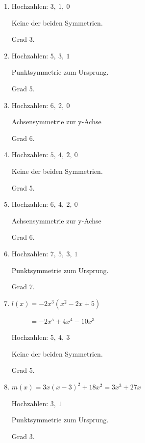 \begin{Answer}[ref=ganzSymA1]

	\begin{minipage}{\textwidth}
		\begin{minipage}[t]{0.5\textwidth}
			\begin{enumerate}[label=\alph*)]
				\item Hochzahlen: \(3,\ 1,\ 0\)

				Keine der beiden Symmetrien.
				
				Grad 3.
				\item Hochzahlen: \(5,\ 3,\ 1\)

				Punktsymmetrie zum Ursprung.
				
				Grad 5.
				\item Hochzahlen: \(6,\ 2,\ 0\)

				Achsensymmetrie zur y-Achse
				
				Grad 6.
				\item Hochzahlen: \(5,\ 4,\ 2,\ 0\)

				Keine der beiden Symmetrien.
				
				Grad 5.
			\end{enumerate}
		\end{minipage}%
		\begin{minipage}[t]{0.5\textwidth}
			\begin{enumerate}[label=\alph*)]
				\setcounter{enumi}{4}
				\item Hochzahlen: \(6,\ 4,\ 2,\ 0\)

				Achsensymmetrie zur y-Achse
				
				Grad 6.
				\item Hochzahlen: \(7,\ 5,\ 3,\ 1\)

				Punktsymmetrie zum Ursprung.
				
				Grad 7.
				\item \(l(x)=-2x^3\left(x^2-2x+5\right)\)

				\(\phantom{l(x)}=-2x^5+4x^4-10x^3\)

				Hochzahlen: \(5,\ 4,\ 3\)

				Keine der beiden Symmetrien.
				
				Grad 5.
				\item \(m(x)=3x\left(x-3\right)^2+18x^2=3x^3+27x\)

				Hochzahlen: \(3,\ 1\)

				Punktsymmetrie zum Ursprung.
				
				Grad 3.
			\end{enumerate}
		\end{minipage}%
	\end{minipage}
\end{Answer}